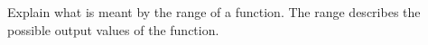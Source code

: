 {Explain what is meant by the range of a function.}
{The range describes the possible output values of the function.}
